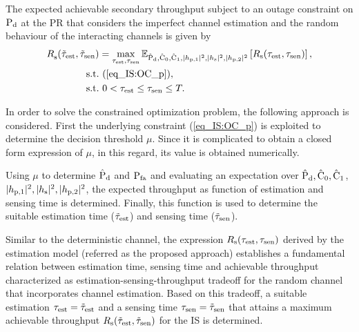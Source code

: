 \begin{theorem} \label{th_IS:th4}
\normalfont
The expected achievable secondary throughput subject to an outage constraint on $\text{P}_{\text{d}}$ at the PR that considers the imperfect channel estimation and the random behaviour of the interacting channels is given by
\begin{align}
{R}_{\text{s}}^{\text{}}(\tilde{\tau}_{\text{est}}, \tilde{\tau}_{\text{sen}}) &= \operatorname*{max}_{\tau_{\text{est}}, \tau_{\text{sen}}} {\mathbb E}_{\hat{\text{P}}_{\text{d}}, \hat{\text{C}}_{\text{0}}, \hat{\text{C}}_{\text{1}}, |h_{\text{p,1}}|^2, |h_{\text{s}}|^2, |h_{\text{p,2}}|^2}\left[ R_{\text{s}}(\tau_{\text{est}}, \tau_{\text{sen}}) \right], \nonumber \\ 
\text{s.t.} & \text{ }  (\ref{eq_IS:OC_p}),  \\
\text{s.t.} & \text{ }  0 < \tau_{\text{est}} \le \tau_{\text{sen}} \le T. \nonumber
\end{align}
\end{theorem}

\begin{IEEEproof}
In order to solve the constrained optimization problem, the following approach is considered. First the underlying constraint (\ref{eq_IS:OC_p}) is exploited to determine the decision threshold $\mu$. Since it is complicated to obtain a closed form expression of $\mu$, in this regard, its value is obtained numerically.

Using $\mu$ to determine $\hat{\text{P}}_{\text{d}}$ and $\text{P}_{\text{fa}}$ and evaluating an expectation over $\hat{\text{P}}_{\text{d}}, \hat{\text{C}}_{\text{0}}, \hat{\text{C}}_{\text{1}}$, $|h_{\text{p,1}}|^2, |h_{\text{s}}|^2, |h_{\text{p,2}}|^2$, the expected throughput as function of estimation and sensing time is determined. Finally, this function is used to determine the suitable estimation time ($\tilde{\tau}_{\text{est}}$) and sensing time ($\tilde{\tau}_{\text{sen}}$).
\end{IEEEproof}


\begin{remark} \label{rem_IS:rem2}
\normalfont
Similar to the deterministic channel, the expression $R_{\text{s}}(\tau_{\text{est}}, \tau_{\text{sen}})$ derived by the estimation model (referred as the proposed approach) establishes a fundamental relation between estimation time, sensing time and achievable throughput  characterized as estimation-sensing-throughput tradeoff for the random channel that incorporates channel estimation. Based on this tradeoff, a suitable estimation $\tau_{\text{est}} = \tilde{\tau}_{\text{est}}$ and a sensing time $\tau_{\text{sen}} = \tilde{\tau}_{\text{sen}}$ that attains a maximum achievable throughput $R_{\text{s}}(\tilde{\tau}_{\text{est}},\tilde{\tau}_{\text{sen}})$ for the IS is determined.
\end{remark}


